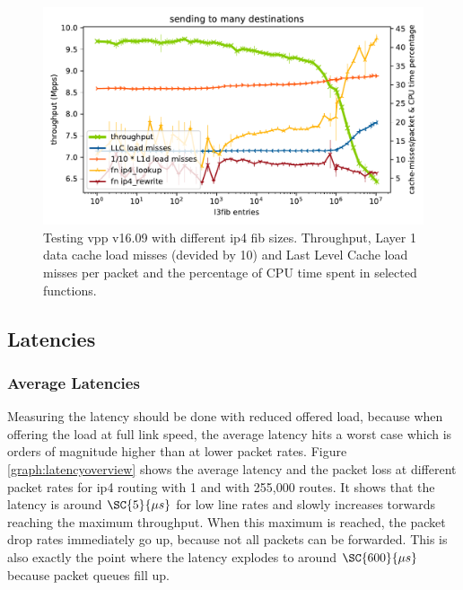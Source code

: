\begin{figure}[!ht]
\noindent\hspace{0.5mm}\includegraphics[width=\linewidth]{pics/throughput_l3_routes_klaipeda_v1609_32ghz_v3.pdf}
\caption{Testing \Ac{vpp} v16.09 with different \Ac{ip4} \Ac{fib} sizes. Throughput, Layer 1 data cache load misses (devided by 10) and Last Level Cache load misses per packet and the percentage of CPU time spent in selected functions. }
\label{graph:ip4fiblegacy}
\end{figure}




\subsection{Latencies}

\subsubsection{Average Latencies}



Measuring the latency should be done with reduced offered load,
because when offering the load at full link speed, the average latency
hits a worst case which is orders of magnitude higher than at lower
packet rates. Figure \ref{graph:latencyoverview} shows the average
latency and the packet loss at different packet rates for \Ac{ip4}
routing with 1 and with 255,000 routes. It shows that the latency is
around $\SC{5}{\mu s}$ for low line rates and slowly increases
torwards reaching the maximum throughput. When this maximum is
reached, the packet drop rates immediately go up, because not all
packets can be forwarded. This is also exactly the point where the
latency explodes to around $\SC{600}{\mu s}$ because packet queues
fill up.

